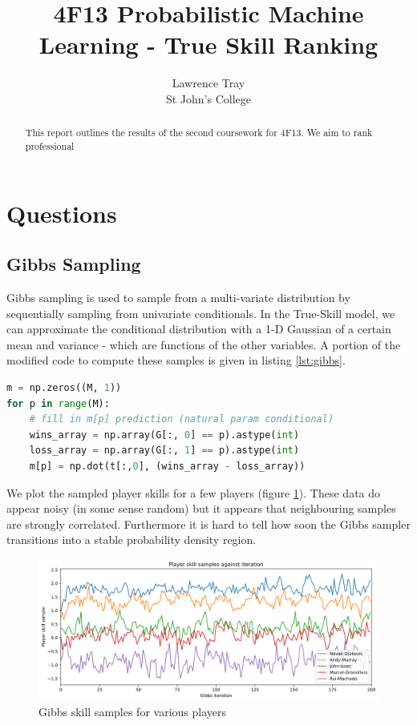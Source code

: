 \documentclass[]{article}
\title{4F13 Probabilistic Machine Learning - True Skill Ranking}
\author{Lawrence Tray \\ St John's College}
\begin{document}


\setcounter{page}{1}
\maketitle

\begin{abstract}
This report outlines the results of the second coursework for 4F13. We aim to rank professional
\end{abstract}

\tableofcontents

\section{Questions}
\subsection{Gibbs Sampling}

Gibbs sampling is used to sample from a multi-variate distribution by sequentially sampling from univariate conditionals. In the True-Skill model, we can approximate the conditional distribution with a 1-D Gaussian of a certain mean and variance - which are functions of the other variables. A portion of the modified code to compute these samples is given in listing \ref{lst:gibbs}.

\begin{lstlisting}[frame=single, caption={Gibbs sampling additions}, label={lst:gibbs}, language={python}]
m = np.zeros((M, 1))
for p in range(M):
	# fill in m[p] prediction (natural param conditional)
	wins_array = np.array(G[:, 0] == p).astype(int)
	loss_array = np.array(G[:, 1] == p).astype(int)
	m[p] = np.dot(t[:,0], (wins_array - loss_array))
\end{lstlisting}

We plot the sampled player skills for a few players (figure \ref{fig:skill-samples-long}). These data do appear noisy (in some sense random) but it appears that neighbouring samples are strongly correlated. Furthermore it is hard to tell how soon the Gibbs sampler transitions into a stable probability density region.

\begin{figure}[!h]
	\centering
	\includegraphics[width=0.8\linewidth]{skill-samples-long.png}
	\caption{Gibbs skill samples for various players}
	\label{fig:skill-samples-long}
\end{figure}
\end{document}
